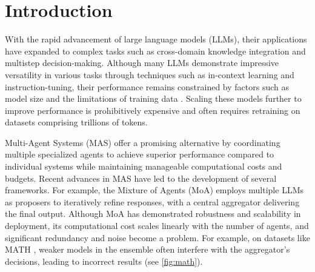 \section{Introduction}

With the rapid advancement of large language models (LLMs), their applications have expanded to complex tasks such as cross-domain knowledge integration and multistep decision-making. Although many LLMs \cite{achiam2023gpt,liu2024deepseek,adams2024llama,team2024gemma,bai2023qwen} demonstrate impressive versatility in various tasks through techniques such as in-context learning and instruction-tuning, their performance remains constrained by factors such as model size and the limitations of training data \cite{jiang2023llm,lu2024merge}. Scaling these models further to improve performance is prohibitively expensive and often requires retraining on datasets comprising trillions of tokens.

Multi-Agent Systems (MAS) \cite{guo2024large} offer a promising alternative by coordinating multiple specialized agents to achieve superior performance compared to individual systems while maintaining manageable computational costs and budgets. Recent advances in MAS have led to the development of several frameworks. For example, the Mixture of Agents (MoA) \cite{wang2024mixture} employs multiple LLMs as proposers to iteratively refine responses, with a central aggregator delivering the final output. Although MoA has demonstrated robustness and scalability in deployment, its computational cost scales linearly with the number of agents, and significant redundancy and noise become a problem. For example, on datasets like MATH \cite{hendrycks2021measuring}, weaker models in the ensemble often interfere with the aggregator’s decisions, leading to incorrect results (see \cref{fig:math}).

